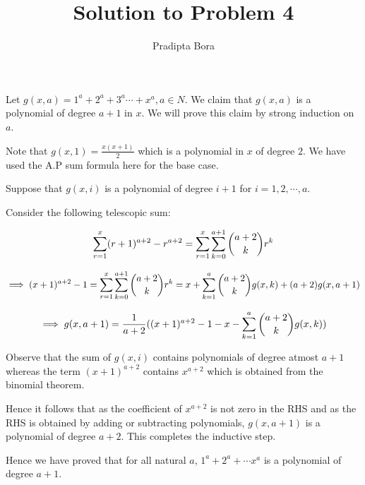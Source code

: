\documentclass[a4paper]{article}
\title{Solution to Problem 4}
\author{Pradipta Bora}
\begin{document}
\maketitle




Let $g(x, a) = 1^a + 2^a + 3^a \cdots +  x^a, a \in N$. We claim that $g(x, a)$ is a polynomial of degree $a+1$ in $x$. We will prove this claim by strong induction on $a$.


Note that $g(x, 1) = \frac{x(x+1)}{2} $ which is a polynomial in $x$ of degree $2$. We have used the A.P sum formula here for the base case.



Suppose that $g(x, i)$ is a polynomial of degree $i+1$ for $i = 1, 2, \cdots, a$.


Consider the following telescopic sum:

$$ \sum_{r=1}^{x} (r+1)^{a+2} - r^{a+2} = \sum_{r=1}^{x} \sum_{k = 0}^{a+1} \dbinom{a+2}{k} r^k $$

$$\implies (x+1)^{a+2} - 1  =  \sum_{r=1}^{x} \sum_{k = 0}^{a+1} \dbinom{a+2}{k} r^k = x + \sum_{k = 1}^{a} \dbinom{a+2}{k} g(x, k) + (a+2)g(x, a+1)$$

$$\implies g(x, a+1) = \frac{1}{a+2}((x+1)^{a+2} - 1 - x - \sum_{k = 1}^{a} \dbinom{a+2}{k} g(x, k))$$


Observe that the sum of $g(x, i)$ contains polynomials of degree atmost $a+1$ whereas the term $(x+1)^{a+2}$ contains $x^{a+2}$ which is obtained from the binomial theorem. 

Hence it follows that as the coefficient of $x^{a+2}$ is not zero in the RHS and as the RHS is obtained by adding or subtracting polynomials, $g(x, a+1)$ is a polynomial of degree $a+2$. This completes the inductive step.

Hence we have proved that for all natural $a$, $1^a + 2^a + \cdots  x^a$ is a polynomial of degree $a+1$.


 
\end{document}
